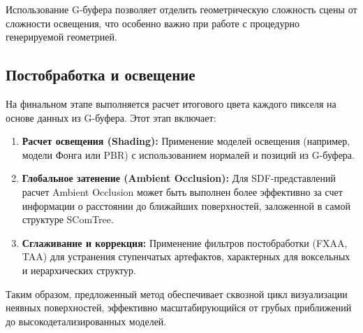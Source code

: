 Использование G-буфера позволяет отделить геометрическую сложность сцены от сложности освещения, что особенно важно при работе с процедурно генерируемой геометрией.

\subsection{Постобработка и освещение}

На финальном этапе выполняется расчет итогового цвета каждого пикселя на основе данных из G-буфера. Этот этап включает:
\begin{enumerate}
    \item \textbf{Расчет освещения (Shading):} Применение моделей освещения (например, модели Фонга или PBR) с использованием нормалей и позиций из G-буфера.
    \item \textbf{Глобальное затенение (Ambient Occlusion):} Для SDF-представлений расчет Ambient Occlusion может быть выполнен более эффективно за счет информации о расстоянии до ближайших поверхностей, заложенной в самой структуре SComTree.
    \item \textbf{Сглаживание и коррекция:} Применение фильтров постобработки (FXAA, TAA) для устранения ступенчатых артефактов, характерных для воксельных и иерархических структур.
\end{enumerate}

Таким образом, предложенный метод обеспечивает сквозной цикл визуализации неявных поверхностей, эффективно масштабирующийся от грубых приближений до высокодетализированных моделей.